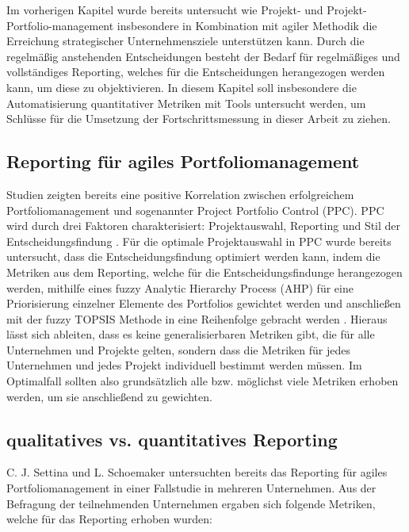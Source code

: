 Im vorherigen Kapitel wurde bereits untersucht wie Projekt- und Projekt-Portfolio-management insbesondere in Kombination mit agiler Methodik die Erreichung strategischer Unternehmensziele unterstützen kann. Durch die regelmäßig anstehenden Entscheidungen besteht der Bedarf für regelmäßiges und vollständiges Reporting, welches für die Entscheidungen herangezogen werden kann, um diese zu objektivieren. In diesem Kapitel soll insbesondere die Automatisierung quantitativer Metriken mit Tools untersucht werden, um Schlüsse für die Umsetzung der Fortschrittsmessung in dieser Arbeit zu ziehen.

\subsection{Reporting für agiles Portfoliomanagement}
Studien zeigten bereits eine positive Korrelation zwischen erfolgreichem Portfoliomanagement und sogenannter Project Portfolio Control (PPC). PPC wird durch drei Faktoren charakterisiert: Projektauswahl, Reporting und Stil der Entscheidungsfindung \cite{ProjectPortfolioControl}.
Für die optimale Projektauswahl in PPC wurde bereits untersucht, dass die Entscheidungsfindung optimiert werden kann, indem die Metriken aus dem Reporting, welche für die Entscheidungsfindunge herangezogen werden, mithilfe eines fuzzy Analytic Hierarchy Process (AHP) für eine Priorisierung einzelner Elemente des Portfolios gewichtet werden und anschließen mit der fuzzy TOPSIS Methode in eine Reihenfolge gebracht werden \cite{Mohammed2021}.
Hieraus lässt sich ableiten, dass es keine generalisierbaren Metriken gibt, die für alle Unternehmen und Projekte gelten, sondern dass die Metriken für jedes Unternehmen und jedes Projekt individuell bestimmt werden müssen. Im Optimalfall sollten also grundsätzlich alle bzw. möglichst viele  Metriken erhoben werden, um sie anschließend zu gewichten.

\subsection{qualitatives vs. quantitatives Reporting}
C. J. Settina und L. Schoemaker \cite{reportingInAgilePortfoliomanagement} untersuchten bereits das Reporting für agiles Portfoliomanagement in einer Fallstudie in mehreren Unternehmen. Aus der Befragung der teilnehmenden Unternehmen ergaben sich folgende Metriken, welche für das Reporting erhoben wurden:

